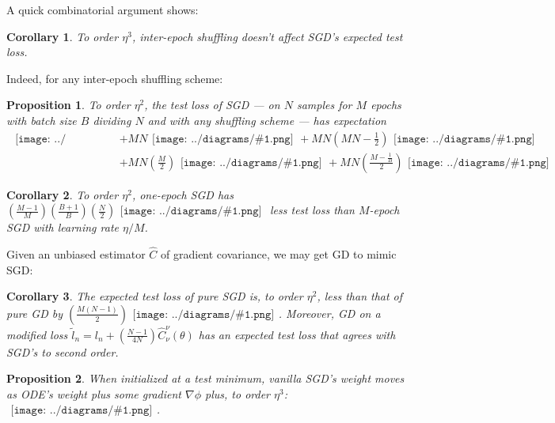 \documentclass{article}
\newtheorem{cor}{Corollary}
\newtheorem{prop}{Proposition}
\newcommand{\wrap}[1]{\left(#1\right)}
\newcommand{\mdia}[1]{\begin{gathered}\texttt{[image: ../diagrams/\#1.png]}\end{gathered}}
\newcommand{\sdia}[1]{\begin{gathered}\texttt{[image: ../diagrams/\#1.png]}\end{gathered}}
\begin{document}
    A quick combinatorial argument shows:
    \begin{cor}
        To order $\eta^3$, inter-epoch shuffling doesn't affect SGD's
        expected test loss.
    \end{cor}
    Indeed, for any inter-epoch shuffling scheme: 
    \begin{prop}\label{prop:ordtwo}
        To order $\eta^2$, the test loss of SGD --- on $N$
        samples for $M$ epochs with batch size $B$ dividing $N$ and with any
        shuffling scheme --- has expectation
        {\small
        \begin{align*}
                                                    \mdia{(0)()}
            &+ MN                                   \mdia{(0-1)(01)}
             + MN\wrap{MN - \frac{1}{2}}            \mdia{(0-1-2)(01-12)} \\
            &+ MN\wrap{\frac{M}{2}}                 \mdia{c(01-2)(02-12)}  
             + MN\wrap{\frac{M-\frac{1}{B}}{2}}     \mdia{c(01-2)(01-12)}
        \end{align*}
        }
    \end{prop}

    \begin{cor}
        To order $\eta^2$, one-epoch SGD has 
        $
             \wrap{\frac{M-1}{M}}\wrap{\frac{B+1}{B}}\wrap{\frac{N}{2}} \sdia{c(01-2)(01-12)}
        $
        less test loss than $M$-epoch SGD with learning rate $\eta/M$. 
    \end{cor}

    Given an unbiased estimator $\hat{C}$ of gradient covariance, we may get
    GD to mimic SGD:
    \begin{cor}
        The expected test loss of pure SGD is, to order $\eta^2$,
        less than that of pure GD by
        $
              \wrap{\frac{M(N-1)}{2}} \sdia{c(01-2)(01-12)}
        $.
        Moreover, GD on a modified loss 
        $
            \tilde l_n = l_n + \wrap{\frac{N-1}{4N}} \hat{C}_\nu^\nu(\theta)
        $
        has an expected test loss that agrees with SGD's to second order.
    \end{cor}

    \begin{prop}
        When initialized at a test minimum, vanilla SGD's weight moves as ODE's
        weight plus some gradient $\nabla\phi$ plus, to order $\eta^3$: 
        $
            \sdia{c(01-2-3)(02-12-23)}
        $.
    \end{prop}
\end{document}
